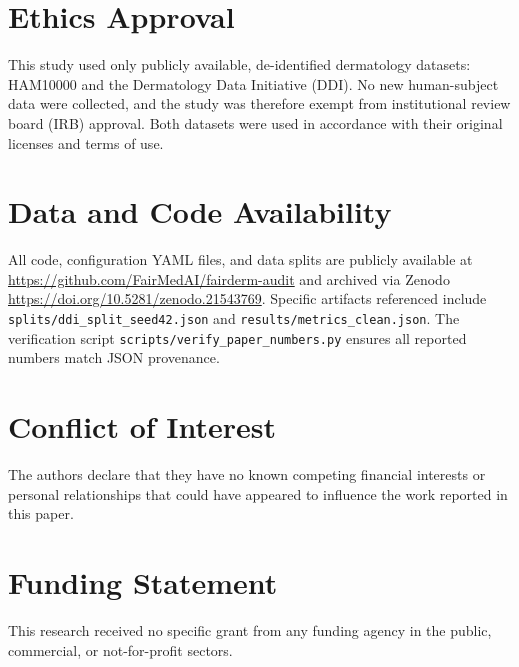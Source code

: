\section*{Ethics Approval}
This study used only publicly available, de-identified dermatology datasets: HAM10000 and the Dermatology Data Initiative (DDI). No new human-subject data were collected, and the study was therefore exempt from institutional review board (IRB) approval. Both datasets were used in accordance with their original licenses and terms of use.

\section*{Data and Code Availability}
All code, configuration YAML files, and data splits are publicly available at \url{https://github.com/FairMedAI/fairderm-audit} and archived via Zenodo \url{https://doi.org/10.5281/zenodo.21543769}. Specific artifacts referenced include \texttt{splits/ddi\_split\_seed42.json} and \texttt{results/metrics\_clean.json}. The verification script \texttt{scripts/verify\_paper\_numbers.py} ensures all reported numbers match JSON provenance.

\section*{Conflict of Interest}
The authors declare that they have no known competing financial interests or personal relationships that could have appeared to influence the work reported in this paper.

\section*{Funding Statement}
This research received no specific grant from any funding agency in the public, commercial, or not-for-profit sectors.
